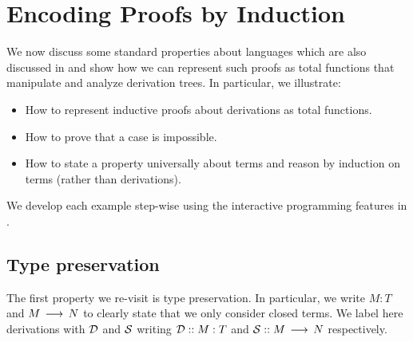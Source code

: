 \chapter{Encoding Proofs by Induction}\label{chap:proofs-basic}

We now discuss some standard properties about languages which are also discussed
in \cite{TAPL} and show how we can represent such proofs as total functions that
manipulate and analyze derivation trees. In particular, we illustrate:

\begin{itemize}
\item How to represent inductive proofs about derivations
   as total functions.
\item How to prove that a case is impossible.
\item How to state a property universally about terms and reason by induction on
  terms (rather than derivations).
\end{itemize}

We develop each example step-wise using the interactive programming features in
\beluga.

\section{Type preservation}

The first property we re-visit is type preservation. In particular, we write
$M : T$ and $M \Steps N$ to clearly state that we only consider closed terms.
We label here derivations with $\D$ and $\S$ writing $\proofderiv{\D}{M : T}$
and $\proofderiv{\S}{M \Steps N}$ respectively.


